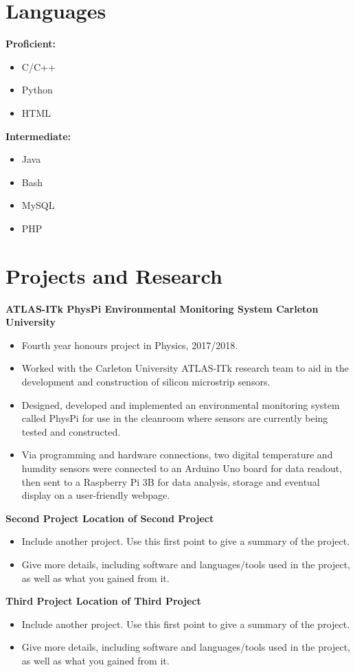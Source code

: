 \documentclass{article}
\begin{document}
{\begin{minipage}[t]{0.3\textwidth}
\section*{Languages}
\textbf{Proficient:}
\begin{itemize}
\item C/C++
\item Python
\item HTML
\end{itemize}
\textbf{Intermediate:}
\begin{itemize}
\item Java
\item Bash
\item MySQL
\item PHP
\end{itemize}
\end{minipage}
\begin{minipage}[t]{0.66\textwidth}
\section*{Projects and Research}
\textbf{ATLAS-ITk PhysPi Environmental Monitoring System \textbar{} Carleton University}
\begin{itemize}
\item Fourth year honours project in Physics, 2017/2018.
\item Worked with the Carleton University ATLAS-ITk research team to aid in the development and construction of silicon microstrip sensors.
\item Designed, developed and implemented an environmental monitoring system called PhysPi for use in the cleanroom where sensors are currently being tested and constructed.
\item Via programming and hardware connections, two digital temperature and humdity sensors were connected to an Arduino Uno board for data readout, then sent to a Raspberry Pi 3B for data analysis, storage and eventual display on a user-friendly webpage.
\end{itemize}
\textbf{Second Project \textbar{} Location of Second Project}
\begin{itemize}
\item Include another project.  Use this first point to give a summary of the project.
\item  Give more details, including software and languages/tools used in the project, as well as what you gained from it.
\end{itemize}
\textbf{Third Project \textbar{} Location of Third Project}
\begin{itemize}
\item Include another project.  Use this first point to give a summary of the project.
\item Give more details, including software and languages/tools used in the project, as well as what you gained from it.
\end{itemize}

\end{minipage}}
\end{document}
